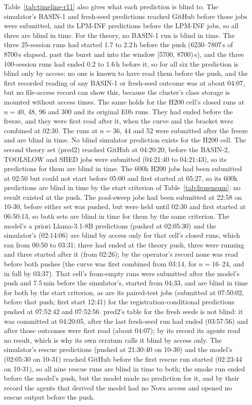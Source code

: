 Table~\ref{tab:timeline-r11} also gives what each prediction is blind to. The simulator's BASIN-1 and fresh-seed predictions reached GitHub before those jobs were submitted, and its LPM-INF predictions before the LPM-INF jobs, so all three are blind in time. For the theory, no BASIN-1 run is blind in time. The three 25-session runs had started 1.7 to 2.2\,h before the push (6230--7807\,s of 8700\,s elapsed, past the burst and into the window [5700, 8700)\,s), and the three 100-session runs had ended 0.2 to 1.6\,h before it, so for all six the prediction is blind only by access: no one is known to have read them before the push, and the first recorded reading of any BASIN-1 or fresh-seed outcome was at about 04:07, but no file-access record can show this, because the cluster's class storage is mounted without access times. The same holds for the H200 cell's closed runs at $n=40$, 48, 96 and 300 and its original E0b runs. They had ended before the freeze, and they were first read after it, when the curve and the bracket were combined at 02:30. The runs at $n=36$, 44 and 52 were submitted after the freeze and are blind in time. No blind simulator prediction exists for the H200 cell. The second theory set (pred2) reached GitHub at 04:20:20, before the BASIN-2, TOOLSLOW and SHED jobs were submitted (04:21:40 to 04:21:43), so its predictions for them are blind in time. The 600k H200 jobs had been submitted at 02:50 but could not start before 05:00 and first started at 05:27, so its 600k predictions are blind in time by the start criterion of Table~\ref{tab:frozensum}: no result existed at the push. The pool-sweep jobs had been submitted at 22:58 on 10-30, before either set was pushed, but were held until 02:30 and first started at 06:50:13, so both sets are blind in time for them by the same criterion. The model's a priori Llama-3.1-8B predictions (pushed at 02:05:30) and the simulator's (02:14:06) are blind by access only for that cell's closed runs, which ran from 00:50 to 03:31: three had ended at the theory push, three were running and three started after it (from 02:26); by the operator's record none was read before both pushes (the curve was first combined from 03:14, for $n=16$--24, and in full by 03:37). That cell's from-empty runs were submitted after the model's push and 7.5\,min before the simulator's, started from 04:33, and are blind in time for both by the start criterion, as are its paired-test jobs (submitted at 07:50:02, before that push; first start 12:41) for the registration-conditional predictions pushed at 07:52:42 and 07:52:56. pred2's table for the fresh seeds is not blind: it was committed at 04:20:05, after the last fresh-seed run had ended (03:57:56) and after those outcomes were first read (about 04:07); by its record its agents read no result, which is why its own erratum calls it blind by access only. The simulator's rescue predictions (pushed at 21:30:40 on 10-30) and the model's (02:05:30 on 10-31) reached GitHub before the first rescue run started (02:23:44 on 10-31), so all nine rescue runs are blind in time to both; the smoke run ended before the model's push, but the model made no prediction for it, and by their record the agents that derived the model had no Nova access and opened no rescue output before the push.


